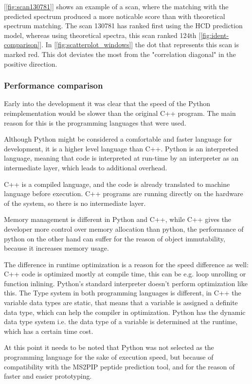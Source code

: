 \documentclass[11pt]{article}
\begin{document}
[\cref{fig:scan130781}] shows an example of a scan, where the matching with the predicted spectrum produced a more noticable score than with theoretical spectrum matching. The scan 130781 has ranked first using the HCD prediction model, whereas using theoretical spectra, this scan ranked 124th [\cref{fig:ident-comparison}]. In [\cref{fig:scatterplot_windows}] the dot that represents this scan is marked red. This dot deviates the most from the "correlation diagonal" in the positive direction.

\subsubsection{Performance comparison}
Early into the development it was clear that the speed of the Python reimplementation would be slower than the original C++ program. The main reason for this is the programming languages that were used. 

Although Python might be considered a comfortable and faster language for development, it is a higher level language than C++. Python is an interpreted language, meaning that code is interpreted at run-time by an interpreter as an intermediate layer, which leads to additional overhead.

C++ is a compiled language, and the code is already translated to machine language before execution. C++ programs are running directly on the hardware of the system, so there is no intermediate layer. 

Memory management is different in Python and C++, while C++ gives the developer more control over memory allocation than python, the performance of python on the other hand can suffer for the reason of object immutability, because it increases memory usage. 

The difference in runtime optimization is a reason for the speed difference as well: C++ code is optimized mostly at compile time, this can be e.g. loop unrolling or function inlining. Python's standard interpreter doesn't perform optimization like this. The Type system in both programming languages is different, in C++ the variable data types are static, that means that a variable is assigned a definite data type, which can help the compiler in optimization. Python has the dynamic data type system i.e. the data type of a variable is determined at the runtime, which has a certain time cost.

At this point it needs to be noted that Python was not selected as the programming language for the sake of execution speed, but because of compatibility with the MS2PIP peptide prediction tool, and for the reason of faster and easier prototyping.
\end{document}
